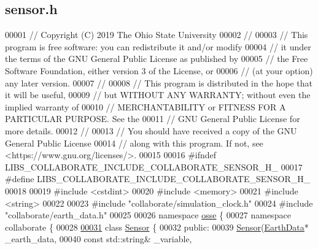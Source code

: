 \hypertarget{sensor_8h_source}{}\subsection{sensor.\+h}
\label{sensor_8h_source}

\begin{DoxyCode}
00001 \textcolor{comment}{// Copyright (C) 2019 The Ohio State University}
00002 \textcolor{comment}{//}
00003 \textcolor{comment}{// This program is free software: you can redistribute it and/or modify}
00004 \textcolor{comment}{// it under the terms of the GNU General Public License as published by}
00005 \textcolor{comment}{// the Free Software Foundation, either version 3 of the License, or}
00006 \textcolor{comment}{// (at your option) any later version.}
00007 \textcolor{comment}{//}
00008 \textcolor{comment}{// This program is distributed in the hope that it will be useful,}
00009 \textcolor{comment}{// but WITHOUT ANY WARRANTY; without even the implied warranty of}
00010 \textcolor{comment}{// MERCHANTABILITY or FITNESS FOR A PARTICULAR PURPOSE.  See the}
00011 \textcolor{comment}{// GNU General Public License for more details.}
00012 \textcolor{comment}{//}
00013 \textcolor{comment}{// You should have received a copy of the GNU General Public License}
00014 \textcolor{comment}{// along with this program.  If not, see <https://www.gnu.org/licenses/>.}
00015 
00016 \textcolor{preprocessor}{#ifndef LIBS\_COLLABORATE\_INCLUDE\_COLLABORATE\_SENSOR\_H\_}
00017 \textcolor{preprocessor}{#define LIBS\_COLLABORATE\_INCLUDE\_COLLABORATE\_SENSOR\_H\_}
00018 
00019 \textcolor{preprocessor}{#include <cstdint>}
00020 \textcolor{preprocessor}{#include <memory>}
00021 \textcolor{preprocessor}{#include <string>}
00022 
00023 \textcolor{preprocessor}{#include "collaborate/simulation\_clock.h"}
00024 \textcolor{preprocessor}{#include "collaborate/earth\_data.h"}
00025 
00026 \textcolor{keyword}{namespace }\hyperlink{namespaceosse}{osse} \{
00027 \textcolor{keyword}{namespace }collaborate \{
00028 
\hyperlink{classosse_1_1collaborate_1_1_sensor}{00031} \textcolor{keyword}{class }\hyperlink{classosse_1_1collaborate_1_1_sensor}{Sensor} \{
00032  \textcolor{keyword}{public}:
00039   \hyperlink{classosse_1_1collaborate_1_1_sensor_a54618610f28a522fa48dd43ea4cdac9a}{Sensor}(\hyperlink{classosse_1_1collaborate_1_1_earth_data}{EarthData}* \_earth\_data,
00040          \textcolor{keyword}{const} std::string& \_variable,

\end{DoxyCode}
